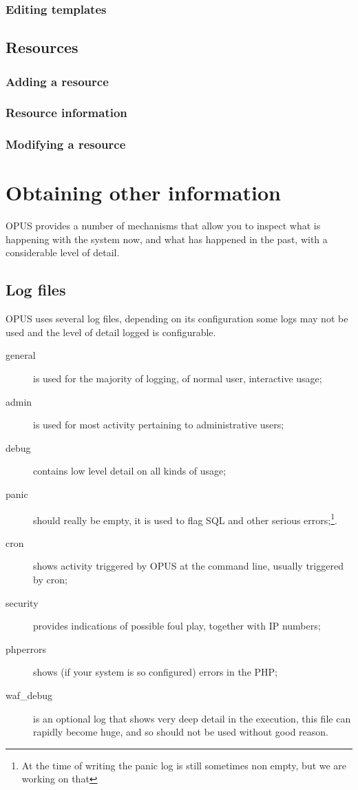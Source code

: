 \documentclass[12 pt]{book}
\begin{document}
\subsection{Editing templates}

\section{Resources}

\subsection{Adding a resource}

\subsection{Resource information}

\subsection{Modifying a resource}

%
%
%

\chapter{Obtaining other information}

OPUS provides a number of mechanisms that allow you to inspect what is happening with the
system now, and what has happened in the past, with a considerable level of detail.

\section{Log files}

OPUS uses several log files, depending on its configuration some logs may not be used and
the level of detail logged is configurable.

\begin{description}
  \item[general] is used for the majority of logging, of normal user, interactive usage;
  \item[admin] is used for most activity pertaining to administrative users;
  \item[debug] contains low level detail on all kinds of usage;
  \item[panic] should really be empty, it is used to flag SQL and other serious errors;\footnote{At the time of writing the panic log is still sometimes non empty, but we are working on that}.
  \item[cron] shows activity triggered by OPUS at the command line, usually triggered by cron;
  \item[security] provides indications of possible foul play, together with IP numbers;
  \item[phperrors] shows (if your system is so configured) errors in the PHP;
  \item[waf\_debug] is an optional log that shows very deep detail in the execution, this file can rapidly become huge, and so should not be used without good reason.
\end{description}
\end{document}
